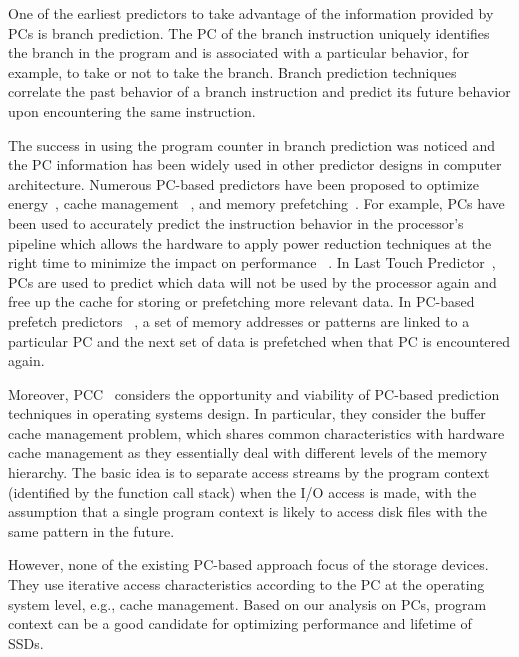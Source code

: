 One of the earliest predictors to take advantage of the
information provided by PCs is branch prediction. 
The PC of the branch instruction uniquely identifies
the branch in the program and is associated with a particular
behavior, for example, to take or not to take the
branch. Branch prediction techniques correlate the past
behavior of a branch instruction and predict its future behavior
upon encountering the same instruction.

The success in using the program counter in branch
prediction was noticed and the PC information has been
widely used in other predictor designs in computer architecture.
Numerous PC-based predictors have been
proposed to optimize energy~\cite{cacheenergy}, cache management~\cite{cachemngmt}
, and memory prefetching~\cite{memoryprefetching}. 
For example, PCs have been used to accurately predict
the instruction behavior in the processor's pipeline
which allows the hardware to apply power reduction techniques
at the right time to minimize the impact on performance~\cite{cacheenergy}
. In Last Touch Predictor~\cite{cachemngmt}, PCs are
used to predict which data will not be used by the processor
again and free up the cache for storing or prefetching
more relevant data. In PC-based prefetch predictors~\cite{memoryprefetching}
, a set of memory addresses or
patterns are linked to a particular PC and the next set of
data is prefetched when that PC is encountered again.

Moreover, PCC~\cite{PC} considers the opportunity and 
viability of PC-based prediction techniques
in operating systems design. In particular, they consider
the buffer cache management problem, which shares common
characteristics with hardware cache management as
they essentially deal with different levels of the memory
hierarchy.
The basic idea is to separate access streams by the program
context (identified by the function call stack) when the I/O
access is made, with the assumption that a single program
context is likely to access disk files with the same pattern in
the future.

However, none of the existing PC-based approach focus of the storage devices.
They use iterative access characteristics according to the PC 
at the operating system level, e.g., cache management.
Based on our analysis on PCs, program context can be a good candidate 
for optimizing performance and lifetime of SSDs.
